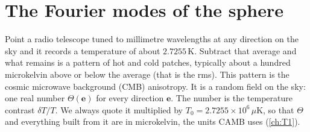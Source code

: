 \providecommand{\SBksTen}{}\renewcommand{\SBksTen}{0.8436}
\providecommand{\SBksFifty}{}\renewcommand{\SBksFifty}{0.3608}
\providecommand{\SBksThree}{}\renewcommand{\SBksThree}{0.6115}
\providecommand{\SBvrTwo}{}\renewcommand{\SBvrTwo}{1.021}
\providecommand{\SBvrTen}{}\renewcommand{\SBvrTen}{1.000}
\providecommand{\SBvrFifty}{}\renewcommand{\SBvrFifty}{1.015}
\providecommand{\SBvrThree}{}\renewcommand{\SBvrThree}{0.998}
\providecommand{\SBerrTwo}{}\renewcommand{\SBerrTwo}{0.01483}
\providecommand{\SBerrThree}{}\renewcommand{\SBerrThree}{0.01005}
\providecommand{\SBmeanDevMax}{}\renewcommand{\SBmeanDevMax}{3.081}
\providecommand{\SBslopeHi}{}\renewcommand{\SBslopeHi}{-0.5133}
\providecommand{\SBslopeTwo}{}\renewcommand{\SBslopeTwo}{-0.5011}
\providecommand{\SBcoefTwo}{}\renewcommand{\SBcoefTwo}{2.098}
\providecommand{\SBoffSdFiveH}{}\renewcommand{\SBoffSdFiveH}{0.04741}
\providecommand{\SBoffInvFiveH}{}\renewcommand{\SBoffInvFiveH}{0.04472}
\providecommand{\SBoffSdAll}{}\renewcommand{\SBoffSdAll}{0.007064}
\providecommand{\SBoffInvAll}{}\renewcommand{\SBoffInvAll}{0.007071}
\providecommand{\SBoffMaxBig}{}\renewcommand{\SBoffMaxBig}{0.02929}
\providecommand{\SBnOffBig}{}\renewcommand{\SBnOffBig}{44551}
\providecommand{\SBknoxErr}{}\renewcommand{\SBknoxErr}{7.1}
\providecommand{\SBhpN}{}\renewcommand{\SBhpN}{3000}
\providecommand{\SBhpKsTwo}{}\renewcommand{\SBhpKsTwo}{0.5166}
\providecommand{\SBhpKsTen}{}\renewcommand{\SBhpKsTen}{0.998}
\providecommand{\SBhpKsFifty}{}\renewcommand{\SBhpKsFifty}{0.9504}
\providecommand{\SBhpVrTwo}{}\renewcommand{\SBhpVrTwo}{0.973}
\providecommand{\SBhpVrFifty}{}\renewcommand{\SBhpVrFifty}{0.996}
\providecommand{\SBphNspot}{}\renewcommand{\SBphNspot}{40}
\providecommand{\SBphMaxDiff}{}\renewcommand{\SBphMaxDiff}{5.322\times10^{-16}}
\providecommand{\SBphSkewA}{}\renewcommand{\SBphSkewA}{2.903}
\providecommand{\SBphSkewB}{}\renewcommand{\SBphSkewB}{0.01184}
\section{The Fourier modes of the sphere}
\label{7b:sec:harmonics}

Point a radio telescope tuned to millimetre wavelengths at any direction on the sky and it
records a temperature of about $2.7255$\,K. Subtract that average and what remains is a pattern
of hot and cold patches, typically about a hundred microkelvin above or below the average (that
is the rms). This pattern is the cosmic microwave background (CMB) anisotropy. It is a random
field on the sky: one real number $\Theta(\bm e)$ for every direction $\bm e$. The number is the
temperature contrast $\delta T/T$. We always quote it multiplied by
$T_0=2.7255\times10^6\,\mu$K, so that $\Theta$ and everything built from it are in microkelvin,
the units CAMB uses (\cref{ch:T1}).


